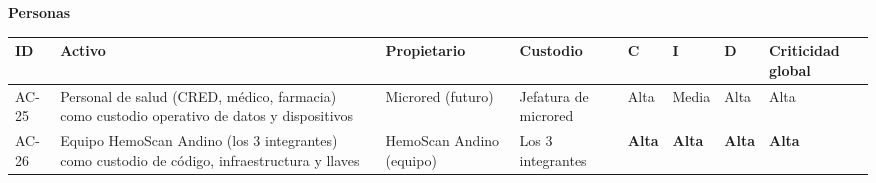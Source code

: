 \documentclass[11pt,a4paper]{article}
\begin{document}
\textbf{Personas}

{\small
\begin{longtable}[]{@{}
  >{\raggedright\arraybackslash}p{}
  >{\raggedright\arraybackslash}p{}
  >{\raggedright\arraybackslash}p{}
  >{\raggedright\arraybackslash}p{}
  >{\raggedright\arraybackslash}p{}
  >{\raggedright\arraybackslash}p{}
  >{\raggedright\arraybackslash}p{}
  >{\raggedright\arraybackslash}p{}@{}}
\toprule\noalign{}
\begin{minipage}[b]{\linewidth}\raggedright
ID
\end{minipage} & \begin{minipage}[b]{\linewidth}\raggedright
Activo
\end{minipage} & \begin{minipage}[b]{\linewidth}\raggedright
Propietario
\end{minipage} & \begin{minipage}[b]{\linewidth}\raggedright
Custodio
\end{minipage} & \begin{minipage}[b]{\linewidth}\raggedright
C
\end{minipage} & \begin{minipage}[b]{\linewidth}\raggedright
I
\end{minipage} & \begin{minipage}[b]{\linewidth}\raggedright
D
\end{minipage} & \begin{minipage}[b]{\linewidth}\raggedright
Criticidad global
\end{minipage} \\
\midrule\noalign{}
\endhead
\bottomrule\noalign{}
\endlastfoot
AC-25 & Personal de salud (CRED, médico, farmacia) como custodio operativo de datos y dispositivos & Microred (futuro) & Jefatura de microred & Alta & Media & Alta & Alta \\
AC-26 & Equipo HemoScan Andino (los 3 integrantes) como custodio de código, infraestructura y llaves & HemoScan Andino (equipo) & Los 3 integrantes & \textbf{Alta} & \textbf{Alta} & \textbf{Alta} & \textbf{Alta} \\
\end{longtable}
}
\end{document}
